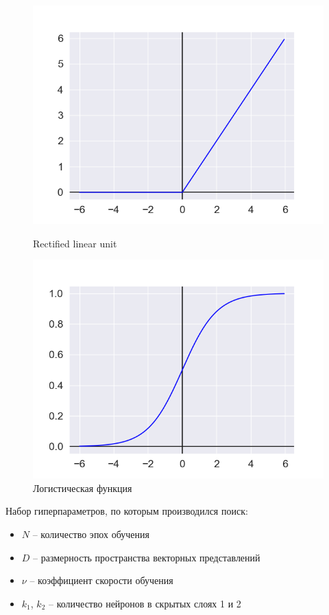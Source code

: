 \begin{figure}[h!]
\centering
\begin{minipage}{.5\textwidth}
\centering
\includegraphics[width=1.0\linewidth]{images/relu}
\caption{Rectified linear unit}
\label{fig:relu}
\end{minipage}%
\begin{minipage}{.5\textwidth}
\centering
\includegraphics[width=1.0\linewidth]{images/sigmoid}
\caption{Логистическая функция}
\label{fig:sigmoid}
\end{minipage}
\end{figure}

Набор гиперпараметров, по которым производился поиск:
\begin{itemize}
    \item $N$ -- количество эпох обучения
    \item $D$ -- размерность пространства векторных представлений
    \item $\nu$ -- коэффициент скорости обучения
    \item $k_1$, $k_2$ -- количество нейронов в скрытых слоях 1 и 2
\end{itemize}

